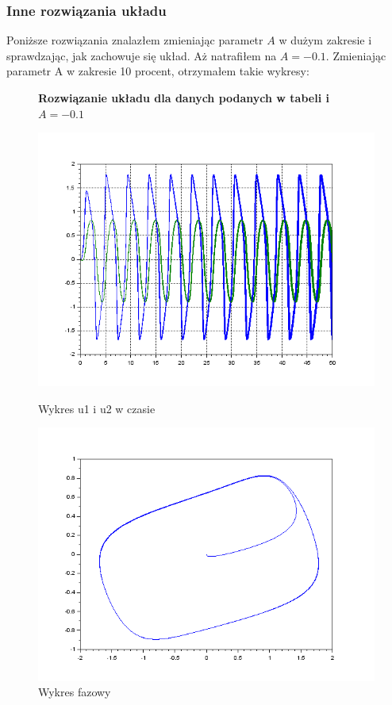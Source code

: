 \documentclass[12pt]{article}
\begin{document}
\subsubsection{Inne rozwiązania układu}
Poniższe rozwiązania znalazłem zmieniając parametr $A$ w dużym zakresie i sprawdzając, jak zachowuje się układ. Aż natrafiłem na $A=-0.1$. Zmieniając parametr A w zakresie 10 procent, otrzymałem takie wykresy:

\begin{figure}[H]
\textbf{Rozwiązanie układu dla danych podanych w tabeli i $A=-0.1$}
  \centering
  \begin{minipage}[b]{0.49\textwidth}
    \includegraphics[scale=0.4]{./img/3-1-oscylacje-xy}
    \caption{Wykres u1 i u2 w czasie}
    \end{minipage}
  \hfill
  \begin{minipage}[b]{0.49\textwidth}
    \includegraphics[scale=0.4]{./img/3-1-oscylacje-phase}
    \caption{Wykres fazowy}
  \end{minipage}
\end{figure}
\end{document}
